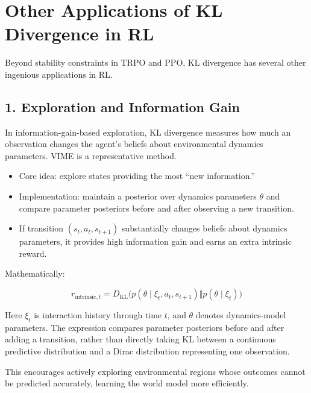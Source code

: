 \setcounter{section}{3}

\hypertarget{other-applications-of-kl-divergence-in-rl}{%
\section{Other Applications of KL Divergence in RL}\label{other-applications-of-kl-divergence-in-rl}}

Beyond stability constraints in TRPO and PPO, KL divergence has several other ingenious applications in RL.

\hypertarget{exploration-and-information-gain}{%
\subsection{1. Exploration and Information Gain}\label{exploration-and-information-gain}}

In information-gain-based exploration, KL divergence measures how much an observation changes the agent's beliefs about environmental dynamics parameters. VIME is a representative method.

\begin{itemize}
\tightlist
\item
  Core idea: explore states providing the most ``new information.''
\item
  Implementation: maintain a posterior over dynamics parameters \(\theta\) and compare parameter posteriors before and after observing a new transition.
\item
  If transition \((s_t,a_t,s_{t+1})\) substantially changes beliefs about dynamics parameters, it provides high information gain and earns an extra intrinsic reward.
\end{itemize}

Mathematically:

\[
r_{\mathrm{intrinsic},t}
=
D_{\mathrm{KL}}\bigl(
p(\theta\mid \xi_t,a_t,s_{t+1})
\Vert
p(\theta\mid \xi_t)
\bigr)
\]

Here \(\xi_t\) is interaction history through time \(t\), and \(\theta\) denotes dynamics-model parameters. The expression compares parameter posteriors before and after adding a transition, rather than directly taking KL between a continuous predictive distribution and a Dirac distribution representing one observation.

This encourages actively exploring environmental regions whose outcomes cannot be predicted accurately, learning the world model more efficiently.

